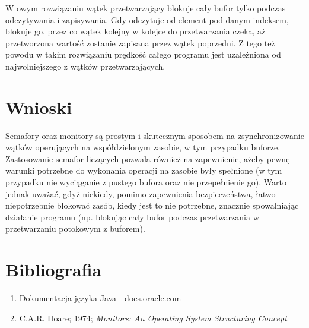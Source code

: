 \documentclass{article}
\begin{document}
W owym rozwiązaniu wątek przetwarzający blokuje cały bufor tylko podczas odczytywania i zapisywania.
Gdy odczytuje od element pod danym indeksem, blokuje go, przez co wątek kolejny w kolejce do przetwarzania
czeka, aż przetworzona wartość zostanie zapisana przez wątek poprzedni. Z tego też powodu w takim rozwiązaniu
prędkość całego programu jest uzależniona od najwolniejszego z wątków przetwarzających.

\section{Wnioski}
Semafory oraz monitory są prostym i skutecznym sposobem na zsynchronizowanie wątków operujących na współdzielonym
zasobie, w tym przypadku buforze. Zastosowanie semafor liczących pozwala również na zapewnienie, ażeby
pewnę warunki potrzebne do wykonania operacji na zasobie były spełnione (w tym przypadku nie wyciąganie
z pustego bufora oraz nie przepełnienie go). Warto jednak uważać, gdyż niekiedy, pomimo zapewnienia
bezpieczeństwa, łatwo niepotrzebnie blokować zasób, kiedy jest to nie potrzebne, znacznie spowalniając
działanie programu (np. blokując cały bufor podczas przetwarzania w przetwarzaniu potokowym z buforem).

\section{Bibliografia}

\begin{enumerate}
    \item 
    Dokumentacja języka Java - docs.oracle.com
    \item
    C.A.R. Hoare; 1974; \textit{Monitors: An Operating System Structuring Concept}

\end{enumerate}
\end{document}
